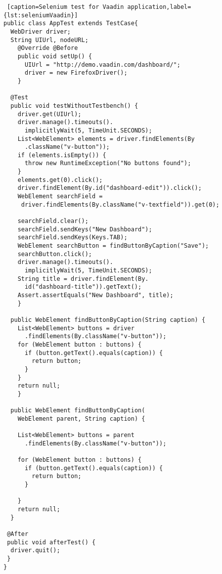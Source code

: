   	
  	\lstset{style=a1listing}
  	\begin{lstlisting} [caption=Selenium test for Vaadin application,label={lst:seleniumVaadin}]
public class AppTest extends TestCase{
  WebDriver driver;
  String UIUrl, nodeURL;	
	@Override @Before
    public void setUp() {
      UIUrl = "http://demo.vaadin.com/dashboard/";
      driver = new FirefoxDriver();
    }

  @Test
  public void testWithoutTestbench() {
    driver.get(UIUrl);
    driver.manage().timeouts().
      implicitlyWait(5, TimeUnit.SECONDS);
    List<WebElement> elements = driver.findElements(By
      .className("v-button"));
    if (elements.isEmpty()) {
      throw new RuntimeException("No buttons found");
    }
    elements.get(0).click();
    driver.findElement(By.id("dashboard-edit")).click();
    WebElement searchField =
     driver.findElements(By.className("v-textfield")).get(0);
    
    searchField.clear();
    searchField.sendKeys("New Dashboard");
    searchField.sendKeys(Keys.TAB);
    WebElement searchButton = findButtonByCaption("Save");
    searchButton.click();
    driver.manage().timeouts().
      implicitlyWait(5, TimeUnit.SECONDS);
    String title = driver.findElement(By.
      id("dashboard-title")).getText();
    Assert.assertEquals("New Dashboard", title);
    }

  public WebElement findButtonByCaption(String caption) {
    List<WebElement> buttons = driver
      .findElements(By.className("v-button"));
    for (WebElement button : buttons) {
      if (button.getText().equals(caption)) {
        return button;
      }
    }
    return null;
    }

  public WebElement findButtonByCaption(
    WebElement parent, String caption) {
   
    List<WebElement> buttons = parent
      .findElements(By.className("v-button"));
    
    for (WebElement button : buttons) {
      if (button.getText().equals(caption)) {
        return button;
      }

    }
    return null;
  }

 @After
 public void afterTest() {
  driver.quit();
 }
}
\end{lstlisting}

